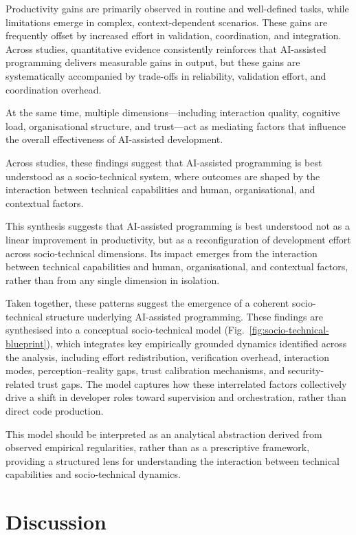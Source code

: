\documentclass[conference]{IEEEtran}
\begin{document}
Productivity gains are primarily observed in routine and well-defined tasks, while limitations emerge in complex, context-dependent scenarios. These gains are frequently offset by increased effort in validation, coordination, and integration. Across studies, quantitative evidence consistently reinforces that AI-assisted programming delivers measurable gains in output, but these gains are systematically accompanied by trade-offs in reliability, validation effort, and coordination overhead.

At the same time, multiple dimensions—including interaction quality, cognitive load, organisational structure, and trust—act as mediating factors that influence the overall effectiveness of AI-assisted development.

Across studies, these findings suggest that AI-assisted programming is best understood as a socio-technical system, where outcomes are shaped by the interaction between technical capabilities and human, organisational, and contextual factors.

This synthesis suggests that AI-assisted programming is best understood not as a linear improvement in productivity, but as a reconfiguration of development effort across socio-technical dimensions. Its impact emerges from the interaction between technical capabilities and human, organisational, and contextual factors, rather than from any single dimension in isolation.

Taken together, these patterns suggest the emergence of a coherent socio-technical structure underlying AI-assisted programming. These findings are synthesised into a conceptual socio-technical model (Fig.~\ref{fig:socio-technical-blueprint}), which integrates key empirically grounded dynamics identified across the analysis, including effort redistribution, verification overhead, interaction modes, perception–reality gaps, trust calibration mechanisms, and security-related trust gaps. The model captures how these interrelated factors collectively drive a shift in developer roles toward supervision and orchestration, rather than direct code production.

This model should be interpreted as an analytical abstraction derived from observed empirical regularities, rather than as a prescriptive framework, providing a structured lens for understanding the interaction between technical capabilities and socio-technical dynamics.

\section{Discussion}
\end{document}
